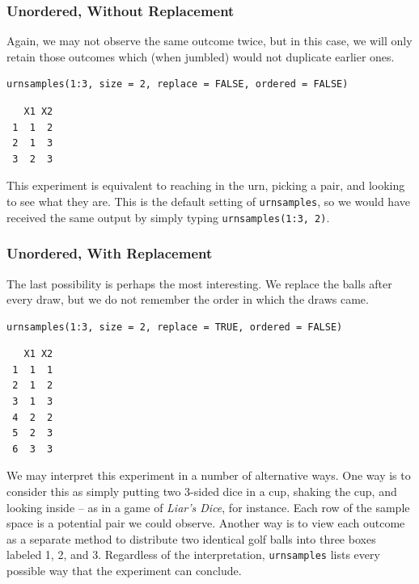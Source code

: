 \documentclass[captions=tableheading]{scrbook}
\begin{document}
\begin{example}
\subsubsection{Unordered, Without Replacement}
\label{sec-4-1-2-4}


Again, we may not observe the same outcome twice, but in this case, we will only retain those outcomes which (when jumbled) would not duplicate earlier ones. 


\begin{verbatim}
urnsamples(1:3, size = 2, replace = FALSE, ordered = FALSE)
\end{verbatim}

\begin{verbatim}
   X1 X2
 1  1  2
 2  1  3
 3  2  3
\end{verbatim}

This experiment is equivalent to reaching in the urn, picking a pair, and looking to see what they are. This is the default setting of \texttt{urnsamples}, so we would have received the same output by simply typing \texttt{urnsamples(1:3, 2)}.
\subsubsection{Unordered, With Replacement}
\label{sec-4-1-2-5}


The last possibility is perhaps the most interesting. We replace the balls after every draw, but we do not remember the order in which the draws came. 


\begin{verbatim}
urnsamples(1:3, size = 2, replace = TRUE, ordered = FALSE)
\end{verbatim}

\begin{verbatim}
   X1 X2
 1  1  1
 2  1  2
 3  1  3
 4  2  2
 5  2  3
 6  3  3
\end{verbatim}

We may interpret this experiment in a number of alternative ways. One way is to consider this as simply putting two 3-sided dice in a cup, shaking the cup, and looking inside -- as in a game of \emph{Liar's Dice}, for instance. Each row of the sample space is a potential pair we could observe. Another way is to view each outcome as a separate method to distribute two identical golf balls into three boxes labeled 1, 2, and 3. Regardless of the interpretation, \texttt{urnsamples} lists every possible way that the experiment can conclude.

\end{example}
\end{document}
